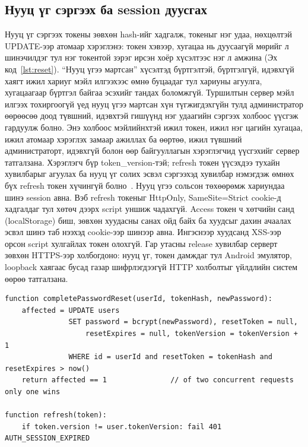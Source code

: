 \subsection{Нууц үг сэргээх ба session дуусгах}
Нууц үг сэргээх токены зөвхөн hash-ийг хадгалж, токеныг нэг удаа, нөхцөлтэй UPDATE-ээр атомаар хэрэглэнэ: токен хэвээр, хугацаа нь дуусаагүй мөрийг л шинэчилдэг тул нэг токентой зэрэг ирсэн хоёр хүсэлтээс нэг л амжина (Эх код~\ref{lst:reset}). ``Нууц үгээ мартсан'' хүсэлтэд бүртгэлтэй, бүртгэлгүй, идэвхгүй хаягт ижил хариуг мэйл илгээхээс өмнө буцаадаг тул хариуны агуулга, хугацаагаар бүртгэл байгаа эсэхийг тандах боломжгүй. Туршилтын сервер мэйл илгээх тохиргоогүй үед нууц үгээ мартсан хүн түгжигдэхгүйн тулд администратор өөрөөсөө доод түвшний, идэвхтэй гишүүнд нэг удаагийн сэргээх холбоос үүсгэж гардуулж болно. Энэ холбоос мэйлийнхтэй ижил токен, ижил нэг цагийн хугацаа, ижил атомаар хэрэглэх замаар ажиллах ба өөртөө, ижил түвшний администраторт, идэвхгүй болон өөр байгууллагын хэрэглэгчид үүсгэхийг сервер татгалзана. Хэрэглэгч бүр token\_version-тэй; refresh токен үүсэхдээ тухайн хувилбарыг агуулах ба нууц үг солих эсвэл сэргээхэд хувилбар нэмэгдэж өмнөх бүх refresh токен хүчингүй болно~\cite{jwt}. Нууц үгээ сольсон төхөөрөмж хариундаа шинэ session авна. Вэб refresh токеныг HttpOnly, SameSite=Strict cookie-д хадгалдаг тул хөтөч дээрх script уншиж чадахгүй. Access токен ч хөтчийн санд (localStorage) биш, зөвхөн хуудасны санах ойд байх ба хуудсыг дахин ачаалах эсвэл шинэ таб нээхэд cookie-ээр шинээр авна. Ингэснээр хуудсанд XSS-ээр орсон script хулгайлах токен олохгүй. Гар утасны release хувилбар серверт зөвхөн HTTPS-ээр холбогдоно: нууц үг, токен дамждаг тул Android эмулятор, loopback хаягаас бусад газар шифрлэгдээгүй HTTP холболтыг үйлдлийн систем өөрөө татгалзана.

\begin{lstlisting}[caption={Сэргээх токеныг атомаар хэрэглэх},label={lst:reset}]
function completePasswordReset(userId, tokenHash, newPassword):
    affected = UPDATE users
               SET password = bcrypt(newPassword), resetToken = null,
                   resetExpires = null, tokenVersion = tokenVersion + 1
               WHERE id = userId and resetToken = tokenHash and resetExpires > now()
    return affected == 1               // of two concurrent requests only one wins

function refresh(token):
    if token.version != user.tokenVersion: fail 401 AUTH_SESSION_EXPIRED
\end{lstlisting}

